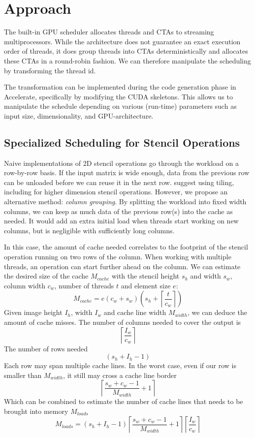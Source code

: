 \documentclass{article}
\newcommand{\ceil}[1]{\left\lceil #1 \right\rceil}
\begin{document}
\section{Approach}
The built-in GPU scheduler allocates threads and CTAs to streaming multiprocessors.
While the architecture does not guarantee an exact execution order of threads, it does group threads into CTAs deterministically and allocates these CTAs in a round-robin fashion.
We can therefore manipulate the scheduling by transforming the thread id.

The transformation can be implemented during the code generation phase in Accelerate, specifically by modifying the CUDA skeletons.
This allows us to manipulate the schedule depending on various (run-time) parameters such as input size, dimensionality, and GPU-architecture.

\subsection{Specialized Scheduling for Stencil Operations}
\label{sec:stencil_schedule}
Naive implementations of 2D stencil operations go through the workload on a row-by-row basis.
If the input matrix is wide enough, data from the previous row can be unloaded before we can reuse it in the next row.
\citet{rivera2000tiling} suggest using tiling, including for higher dimension stencil operations. 
However, we propose an alternative method: \emph{column grouping}.
By splitting the workload into fixed width columns, we can keep as much data of the previous row(s) into the cache as needed.
It would add an extra initial load when threads start working on new columns, but is negligible with sufficiently long columns.

In this case, the amount of cache needed correlates to the footprint of the stencil operation running on two rows of the column.
When working with multiple threads, an operation can start further ahead on the column.
We can estimate the desired size of the cache $M_{cache}$ with the stencil height $s_h$ and width $s_w$, column width $c_w$, number of threads $t$ and element size $e$:
\[
    M_{cache} = e (c_w + s_w) \left(s_h + \ceil{\frac{t}{c_w}}\right) 
\]
Given image height $I_h$, width $I_w$ and cache line width $M_{width}$, we can deduce the amount of cache misses.
The number of columns needed to cover the output is
\[
    \ceil{\frac{I_w}{c_w}}
\]
The number of rows needed
\[
    (s_h + I_h - 1)    
\]
Each row may span multiple cache lines. In the worst case, even if our row is smaller than $M_{width}$, it still may cross a cache line border
\[
    \ceil{\frac{s_w + c_w - 1}{M_{width}} + 1}
\]
Which can be combined to estimate the number of cache lines that needs to be brought into memory $M_{loads}$
\[
    M_{loads} = (s_h + I_h - 1)\ceil{\frac{s_w + c_w - 1}{M_{width}} + 1}\ceil{\frac{I_w}{c_w}}
\]
\end{document}
